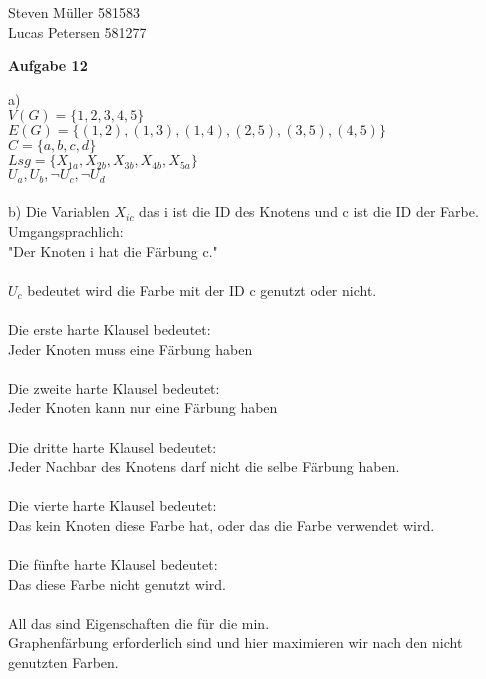 \documentclass[a4paper,12pt]{scrartcl}
\begin{document}
\begin{flushleft}
Steven Müller 581583 \\
Lucas Petersen 581277 
\end{flushleft}
\begin{large}
	\textbf{Aufgabe 12}\\
\end{large}
a)\\
$V(G)=\lbrace 1,2,3,4,5\rbrace$\\
$E(G)=\lbrace(1,2),(1,3),(1,4),(2,5),(3,5),(4,5)\rbrace$\\
$C = \lbrace a,b,c,d\rbrace$\\
$Lsg=\lbrace X_{1a},X_{2b},X_{3b},X_{4b},X_{5a}\rbrace$\\
$U_{a}, U_{b}, \neg U_{c}, \neg U_{d}$\\\\

b) Die Variablen $X_{ic}$ das i ist die ID des Knotens und c ist die ID der Farbe.\\
Umgangsprachlich:\\
"Der Knoten i hat die Färbung c."\\\\

$U_{c}$ bedeutet wird die Farbe mit der ID c genutzt oder nicht.\\\\

Die erste harte Klausel bedeutet:\\
Jeder Knoten muss eine Färbung haben\\\\

Die zweite harte Klausel bedeutet:\\
Jeder Knoten kann nur eine Färbung haben\\\\

Die dritte harte Klausel bedeutet:\\
Jeder Nachbar des Knotens darf nicht die selbe Färbung haben.\\\\

Die vierte harte Klausel bedeutet:\\
Das kein Knoten diese Farbe hat, oder das die Farbe verwendet wird.\\\\

Die fünfte harte Klausel bedeutet:\\
Das diese Farbe nicht genutzt wird.\\\\


All das sind Eigenschaften die für die min.\\ Graphenfärbung erforderlich sind und hier maximieren wir nach den nicht genutzten Farben.
\end{document}
